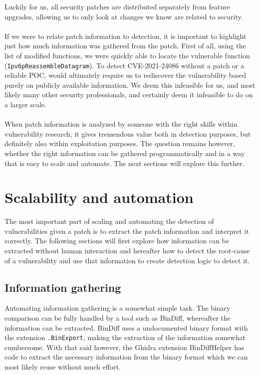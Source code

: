 \documentclass{report}
\begin{document}
Luckily for us, all security patches are distributed separately from feature upgrades, allowing us to only look at changes we know are related to security.
\\
\\
If we were to relate patch information to detection, it is important to highlight just how much information was gathered from the patch. First of all, using the list of modified functions, we were quickly able to locate the vulnerable function (\texttt{Ipv6pReassembleDatagram}). To detect CVE-2021-24086 without a patch or a reliable \gls{POC}, would ultimately require us to rediscover the vulnerability based purely on publicly available information. We deem this infeasible for us, and most likely many other security professionals, and certainly deem it infeasible to do on a larger scale.
\\
\\
When patch information is analyzed by someone with the right skills within vulnerability research, it gives tremendous value both in detection purposes, but definitely also within exploitation purposes. The question remains however, whether the right information can be gathered programmatically and in a way that is easy to scale and automate. The next sections will explore this further.

\section{Scalability and automation}
The most important part of scaling and automating the detection of vulnerabilities given a patch is to extract the patch information and interpret it correctly. The following sections will first explore how information can be extracted without human interaction and hereafter how to detect the root-cause of a vulnerability and use that information to create detection logic to detect it.

\subsection{Information gathering}
Automating information gathering is a somewhat simple task. The binary comparison can be fully handled by a tool such as BinDiff\cite{url:bindiff:homepage}, whereafter the information can be extracted. BinDiff uses a undocumented binary format with the extension \texttt{.BinExport}, making the extraction of the information somewhat cumbersome. With that said however, the Ghidra\cite{url:ghidra:homepage} extension BinDiffHelper\cite{url:BinDiffHelper:homepage} has code to extract the necessary information from the binary format which we can most likely reuse without much effort.
\end{document}
